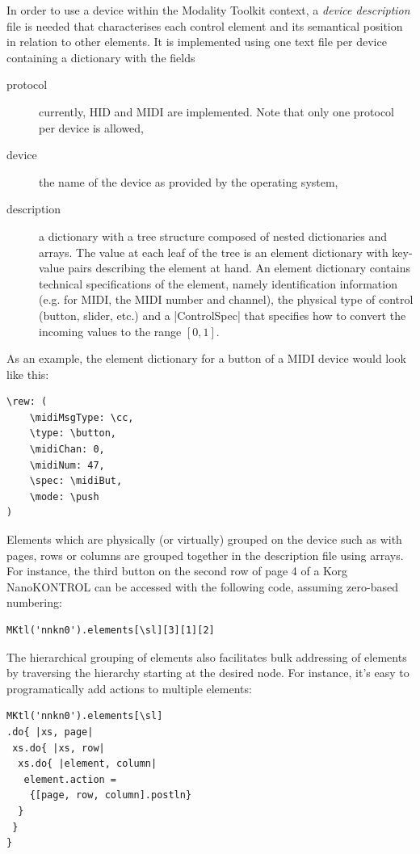 \documentclass{article}
\begin{document}
In order to use a device within the Modality Toolkit context, a \textit{device description} file is needed that characterises each control element and its semantical position in relation to other elements.
It is implemented using one text file per device containing a dictionary with the fields 
\begin{description}
	\item[protocol] currently, HID and MIDI are implemented. Note that only one protocol per device is allowed,
	\item[device] the name of the device as provided by the operating system,
	\item[description] a dictionary with a tree structure composed of nested dictionaries and arrays. The value at each leaf of the tree is an element dictionary with key-value pairs describing the element at hand.
	An element dictionary contains technical specifications of the element, namely identification information (e.g. for MIDI, the MIDI number and channel), the physical type of control (button, slider, etc.) and a |ControlSpec| that specifies how to convert the incoming values to the range $[0,1]$.
\end{description}

As an example, the element dictionary for a button of a MIDI device would look like this:
\begin{Verbatim}
\rew: (
	\midiMsgType: \cc,
	\type: \button,
	\midiChan: 0,
	\midiNum: 47,
	\spec: \midiBut,
	\mode: \push
)
\end{Verbatim}

Elements which are physically (or virtually) grouped on the device such as with pages, rows or columns are grouped together in the description file using arrays. For instance, the third button on the second row of page 4 of a Korg NanoKONTROL can be accessed with the following code, assuming zero-based numbering:

\begin{Verbatim}
MKtl('nnkn0').elements[\sl][3][1][2]
\end{Verbatim}

The hierarchical grouping of elements also facilitates bulk addressing of elements by traversing the hierarchy starting at the desired node. For instance, it's easy to programatically add actions to multiple elements:

\begin{Verbatim}
MKtl('nnkn0').elements[\sl]
.do{ |xs, page|
 xs.do{ |xs, row|
  xs.do{ |element, column|
   element.action = 
    {[page, row, column].postln}
  }
 }
}
\end{Verbatim}
\end{document}
